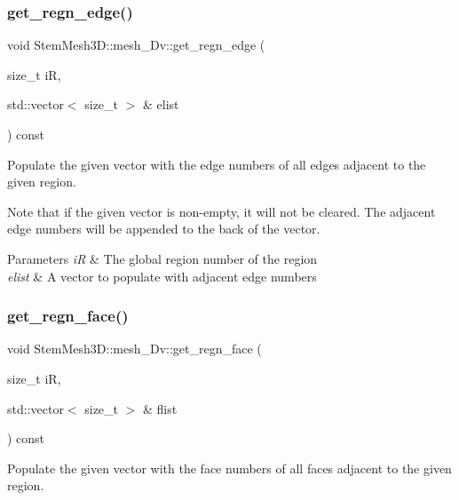 \subsubsection{\texorpdfstring{get\+\_\+regn\+\_\+edge()}{get\_regn\_edge()}}
{\footnotesize\ttfamily void Stem\+Mesh3\+D\+::mesh\+\_\+Dv\+::get\+\_\+regn\+\_\+edge (\begin{DoxyParamCaption}\item[{size\+\_\+t}]{iR,  }\item[{std\+::vector$<$ size\+\_\+t $>$ \&}]{elist }\end{DoxyParamCaption}) const}



Populate the given vector with the edge numbers of all edges adjacent to the given region. 

Note that if the given vector is non-\/empty, it will not be cleared. The adjacent edge numbers will be appended to the back of the vector. 
\begin{DoxyParams}{Parameters}
{\em iR} & The global region number of the region \\
\hline
{\em elist} & A vector to populate with adjacent edge numbers \\
\hline
\end{DoxyParams}
\mbox{\label{classStemMesh3D_1_1mesh__3Dv_a7388f79d9b639140efda17e33d169547}} 
\subsubsection{\texorpdfstring{get\+\_\+regn\+\_\+face()}{get\_regn\_face()}}
{\footnotesize\ttfamily void Stem\+Mesh3\+D\+::mesh\+\_\+Dv\+::get\+\_\+regn\+\_\+face (\begin{DoxyParamCaption}\item[{size\+\_\+t}]{iR,  }\item[{std\+::vector$<$ size\+\_\+t $>$ \&}]{flist }\end{DoxyParamCaption}) const}



Populate the given vector with the face numbers of all faces adjacent to the given region. 

